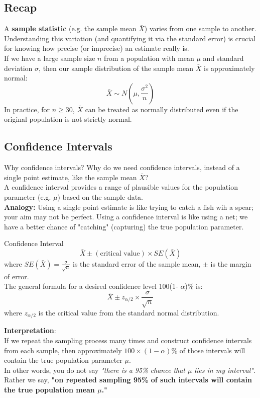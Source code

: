 \documentclass[10pt]{extarticle}
\begin{document}
\subsection{Recap}
A \textbf{sample statistic} (e.g. the sample mean $\bar{X}$) varies from one sample to another. Understanding this variation (and quantifying it via the standard error) is crucial for knowing how precise (or imprecise) an estimate really is. \\[2ex]
If we have a large sample size $n$ from a population with mean $\mu$ and standard deviation $\sigma$, then our sample distribution of the sample mean $\bar{X}$ is approximately normal:
$$\bar{X} \sim N\left(\mu, \frac{\sigma^2}{n}\right)$$
In practice, for $n \geq 30$, $\bar{X}$ can be treated as normally distributed even if the original population is not strictly normal.
\subsection{Confidence Intervals}
\begin{conceptbox}{Why confidence intervals?}{}
    Why do we need confidence intervals, instead of a single point estimate, like the sample mean $\bar{X}$? \\

    A confidence interval provides a range of plausible values for the population parameter (e.g. $\mu$) based on the sample data. \\

    \textbf{Analogy:}  Using a single point estimate is like trying to catch a fish wih a spear; your aim may not be perfect. Using a confidence interval is like using a net; we have a better chance of "catching" (capturing) the true population parameter.
\end{conceptbox}
\begin{definitionbox}{Confidence Interval}{}
    $$\bar{X} \pm (\text{critical value}) \times SE(\bar{X})$$
    where $SE(\bar{X}) = \frac{\sigma}{\sqrt{n}}$ is the standard error of the sample mean, $\pm$ is the margin of error. \\
    The general formula for a desired confidence level 100(1- $\alpha$)\% is:
    $$\bar{X} \pm z_{\alpha/2} \times \frac{\sigma}{\sqrt{n}}$$
    where $z_{\alpha/2}$ is the critical value from the standard normal distribution.
\end{definitionbox}
\noindent\textbf{Interpretation}: \\
If we repeat the sampling process many times and construct confidence intervals from each sample, then approximately $100 \times (1 - \alpha)\%$ of those intervals will contain the true population parameter $\mu$.\\
In other words, you do not say \emph{"there is a 95\% chance that $\mu$ lies in my interval"}. Rather we say, \textbf{"on repeated sampling 95\% of such intervals will contain the true population mean $\mu$."}
\end{document}
